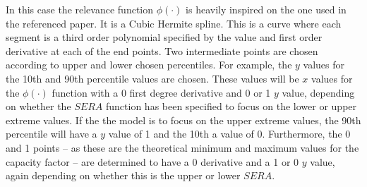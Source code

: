 In this case the relevance function $\phi(\cdot)$ is heavily inspired on the one used in the referenced paper. It is a Cubic Hermite spline. This is a curve where each segment is a third order polynomial specified by the value and first order derivative at each of the end points. Two intermediate points are chosen according to upper and lower chosen percentiles. For example, the $y$ values for the 10th and 90th percentile values are chosen. These values will be $x$ values for the $\phi(\cdot)$ function with a 0 first degree derivative and 0 or 1 $y$ value, depending on whether the $SERA$ function has been specified to focus on the lower or upper extreme values. If the the model is to focus on the upper extreme values, the 90th percentile will have a $y$ value of 1 and the 10th a value of 0. Furthermore, the 0 and 1 points -- as these are the theoretical minimum and maximum values for the capacity factor -- are determined to have a 0 derivative and a 1 or 0 $y$ value, again depending on whether this is the upper or lower $SERA$. 

